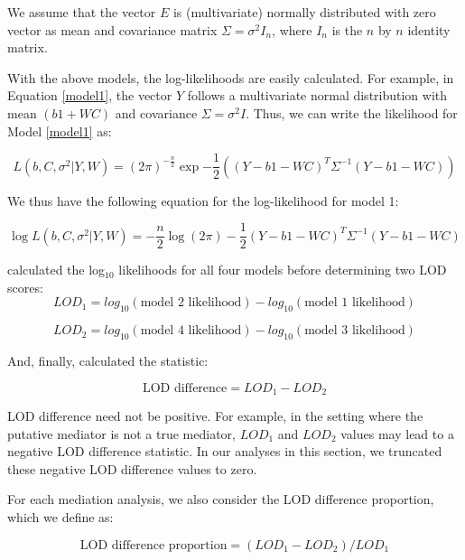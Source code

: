 \documentclass{article}
\begin{document}
We assume that the vector $E$ is (multivariate) normally distributed with zero vector as mean and covariance matrix $\Sigma = \sigma^2I_n$, where $I_n$ is the $n$ by $n$ identity matrix.

With the above models, the log-likelihoods are easily calculated. For example, in Equation \ref{model1}, the vector $Y$ follows a multivariate normal distribution with mean $(b1 + WC)$ and covariance $\Sigma = \sigma^2I$. Thus, we can write the likelihood for Model \ref{model1} as:

\begin{equation}
    L(b, C, \sigma^2| Y, W) = (2\pi)^{- \frac{n}{2}}\exp{ - \frac{1}{2}\left((Y - b1 - WC)^T\Sigma^{-1}(Y - b1 - WC)\right)}
\end{equation}

We thus have the following equation for the log-likelihood for model 1:

\begin{equation}
    \log L(b, C, \sigma^2 | Y, W) = - \frac{n}{2}\log (2\pi) - \frac{1}{2} (Y - b1 - WC)^T\Sigma^{-1}(Y - b1 - WC)
\end{equation}


\citet{chick2016defining} calculated the log$_{10}$ likelihoods for all four models before determining two LOD scores: 
\begin{equation}
LOD_1 = log_{10}(\text{model 2 likelihood}) - log_{10}(\text{model 1 likelihood})
\end{equation}

\begin{equation}
LOD_2 = log_{10}(\text{model 4 likelihood}) - log_{10}(\text{model 3 likelihood})
\end{equation}

And, finally, \citet{keller2018genetic} calculated the statistic:

\begin{equation}
\text{LOD difference} = LOD_1 - LOD_2
\end{equation}

LOD difference need not be positive. For example, in the setting where the putative mediator is not a true mediator, $LOD_1$ and $LOD_2$ values may lead to a negative LOD difference statistic. In our analyses in this section, we truncated these negative LOD difference values to zero. 

For each mediation analysis, we also consider the LOD difference proportion, which we define as:

\begin{equation}
\text{LOD difference proportion} = (LOD_1 - LOD_2) / LOD_1
\end{equation}
\end{document}
